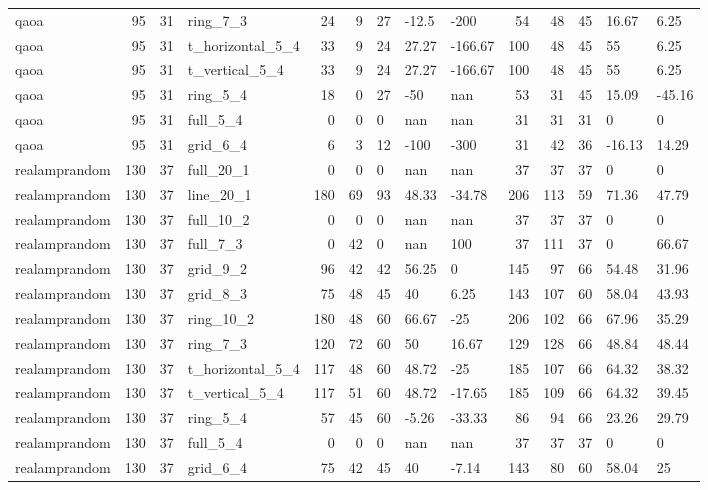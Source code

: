 \begin{longtable}{lrrlrrlllrrlll}
qaoa & 95 & 31 & ring\_7\_3 & 24 & 9 & 27 & -12.5 & -200 & 54 & 48 & 45 & 16.67 & 6.25 \\
qaoa & 95 & 31 & t\_horizontal\_5\_4 & 33 & 9 & 24 & 27.27 & -166.67 & 100 & 48 & 45 & 55 & 6.25 \\
qaoa & 95 & 31 & t\_vertical\_5\_4 & 33 & 9 & 24 & 27.27 & -166.67 & 100 & 48 & 45 & 55 & 6.25 \\
qaoa & 95 & 31 & ring\_5\_4 & 18 & 0 & 27 & -50 & nan & 53 & 31 & 45 & 15.09 & -45.16 \\
qaoa & 95 & 31 & full\_5\_4 & 0 & 0 & 0 & nan & nan & 31 & 31 & 31 & 0 & 0 \\
qaoa & 95 & 31 & grid\_6\_4 & 6 & 3 & 12 & -100 & -300 & 31 & 42 & 36 & -16.13 & 14.29 \\
realamprandom & 130 & 37 & full\_20\_1 & 0 & 0 & 0 & nan & nan & 37 & 37 & 37 & 0 & 0 \\
realamprandom & 130 & 37 & line\_20\_1 & 180 & 69 & 93 & 48.33 & -34.78 & 206 & 113 & 59 & 71.36 & 47.79 \\
realamprandom & 130 & 37 & full\_10\_2 & 0 & 0 & 0 & nan & nan & 37 & 37 & 37 & 0 & 0 \\
realamprandom & 130 & 37 & full\_7\_3 & 0 & 42 & 0 & nan & 100 & 37 & 111 & 37 & 0 & 66.67 \\
realamprandom & 130 & 37 & grid\_9\_2 & 96 & 42 & 42 & 56.25 & 0 & 145 & 97 & 66 & 54.48 & 31.96 \\
realamprandom & 130 & 37 & grid\_8\_3 & 75 & 48 & 45 & 40 & 6.25 & 143 & 107 & 60 & 58.04 & 43.93 \\
realamprandom & 130 & 37 & ring\_10\_2 & 180 & 48 & 60 & 66.67 & -25 & 206 & 102 & 66 & 67.96 & 35.29 \\
realamprandom & 130 & 37 & ring\_7\_3 & 120 & 72 & 60 & 50 & 16.67 & 129 & 128 & 66 & 48.84 & 48.44 \\
realamprandom & 130 & 37 & t\_horizontal\_5\_4 & 117 & 48 & 60 & 48.72 & -25 & 185 & 107 & 66 & 64.32 & 38.32 \\
realamprandom & 130 & 37 & t\_vertical\_5\_4 & 117 & 51 & 60 & 48.72 & -17.65 & 185 & 109 & 66 & 64.32 & 39.45 \\
realamprandom & 130 & 37 & ring\_5\_4 & 57 & 45 & 60 & -5.26 & -33.33 & 86 & 94 & 66 & 23.26 & 29.79 \\
realamprandom & 130 & 37 & full\_5\_4 & 0 & 0 & 0 & nan & nan & 37 & 37 & 37 & 0 & 0 \\
realamprandom & 130 & 37 & grid\_6\_4 & 75 & 42 & 45 & 40 & -7.14 & 143 & 80 & 60 & 58.04 & 25 \\

\end{longtable}
